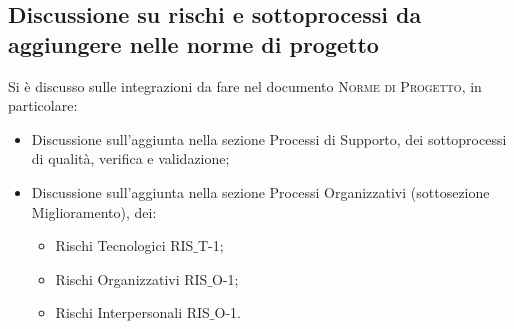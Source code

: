 \subsection{Discussione su rischi e sottoprocessi da aggiungere nelle norme di progetto}
Si è discusso sulle integrazioni da fare nel documento \textsc{Norme di Progetto}, in particolare:
\begin{itemize}
	\item Discussione sull'aggiunta nella sezione Processi di Supporto, dei sottoprocessi di qualità, verifica e validazione;
	\item Discussione sull'aggiunta nella sezione Processi Organizzativi (sottosezione Miglioramento), dei:
	\begin{itemize}
		\item Rischi Tecnologici RIS$\_$T-1;
		\item Rischi Organizzativi RIS$\_$O-1;
		\item Rischi Interpersonali RIS$\_$O-1.
	\end{itemize}
\end{itemize}

